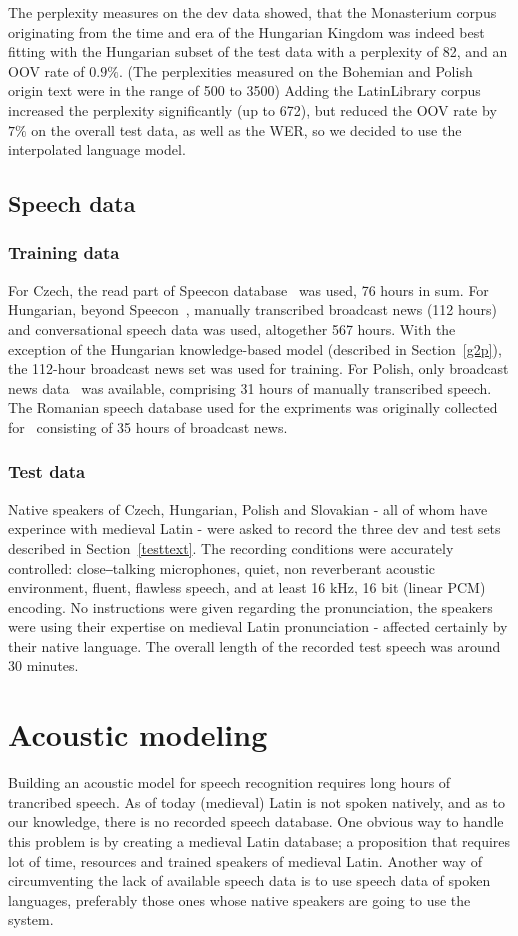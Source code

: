 \documentclass[runningheads,a4paper]{llncs}
\begin{document}
The perplexity measures on the dev data showed, that the Monasterium corpus originating from the time and era of the Hungarian Kingdom was indeed best fitting with the Hungarian subset of the test data with a perplexity of 82, and an OOV rate of $0.9\%$. (The perplexities measured on the Bohemian and Polish origin text were in the range of 500 to 3500)
Adding the LatinLibrary corpus increased the perplexity significantly (up to 672), but reduced the OOV rate by $7\%$ on the overall test data, as well as the WER, so we decided to use the interpolated language model.

\subsection{Speech data}
\subsubsection{Training data}\label{speechtraining}
For Czech, the read part of Speecon database~\cite{czech} was used, 76 hours in sum.
For Hungarian, beyond Speecon~\cite{hungarian}, manually transcribed broadcast news (112 hours) and conversational speech data was used, altogether 567 hours.
With the exception of the Hungarian knowledge-based model (described in Section~\ref{g2p}), the 112-hour broadcast news set was used for training.
For Polish, only broadcast news data~\cite{romanian} was available, comprising 31 hours of manually transcribed speech.
The Romanian speech database used for the expriments was originally collected for~\cite{romanian} consisting of 35 hours of broadcast news.
\subsubsection{Test data}
Native speakers of Czech, Hungarian, Polish and Slovakian - all of whom have experince with medieval Latin - were asked to record the three dev and test sets described in Section~\ref{testtext}.
The recording conditions were accurately controlled: close‒talking microphones, quiet, non reverberant acoustic environment, fluent, flawless speech, and at least 16 kHz, 16 bit (linear PCM) encoding.
No instructions were given regarding the pronunciation, the speakers were using their expertise on medieval Latin pronunciation - affected certainly by their native language.
The overall length of the recorded test speech was around 30 minutes.

\section{Acoustic modeling}\label{AM}
Building an acoustic model for speech recognition requires long hours of trancribed speech.
As of today (medieval) Latin is not spoken natively, and as to our knowledge, there is no recorded speech database.
One obvious way to handle this problem is by creating a medieval Latin database; a proposition that requires lot of time, resources and trained speakers of medieval Latin. 
Another way of circumventing the lack of available speech data is to use speech data of spoken languages, preferably those ones whose native speakers are going to use the system. 
\end{document}
